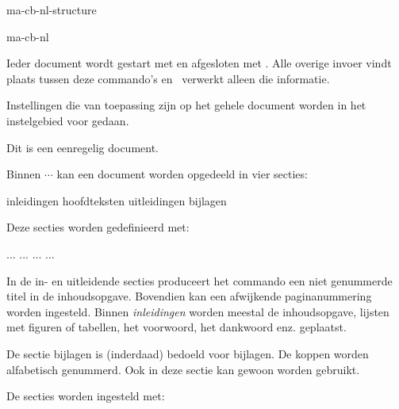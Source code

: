 \startonderdeel ma-cb-nl-structure

\produkt ma-cb-nl


Ieder document wordt gestart met \type{\starttekst} en
afgesloten met \type{\stoptekst}. Alle overige invoer vindt
plaats tussen deze commando's en \CONTEXT\ verwerkt alleen
die informatie.

Instellingen die van toepassing zijn op het gehele document
worden in het instelgebied voor \type{\starttekst} gedaan.

\startbuffer
\stelkorpsin[12pt]
\starttekst
Dit is een eenregelig document.
\stoptekst
\stopbuffer

\typebuffer

Binnen \type{\starttekst} $\cdots$ \type{\stoptekst}
kan een document worden opgedeeld in vier secties:

\startopsomming[n,opelkaar]
\som inleidingen
\som hoofdteksten
\som uitleidingen
\som bijlagen
\stopopsomming

Deze secties worden gedefinieerd met:

\starttypen
\startinleidingen  ... \stopinleidingen
\starthoofdteksten ... \stophoofdteksten
\startuitleidingen ... \stopuitleidingen
\startbijlagen     ... \stopbijlagen
\stoptypen

In de in- en uitleidende secties produceert het commando
\type{\hoofdstuk} een niet genummerde titel in de
inhoudsopgave. Bovendien kan een afwijkende paginanummering
worden ingesteld. Binnen {\em inleidingen} worden meestal de
inhoudsopgave, lijsten met figuren of tabellen, het
voorwoord, het dankwoord enz. geplaatst.

De sectie bijlagen is (inderdaad) bedoeld voor bijlagen. De
koppen worden alfabetisch genummerd. Ook in deze sectie kan
gewoon \type{\hoofdstuk} worden gebruikt.

De secties worden ingesteld met:


\stoponderdeel
